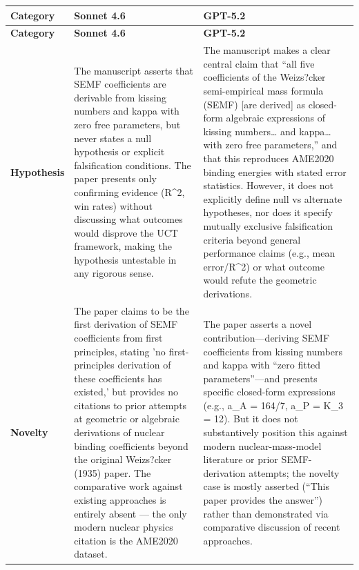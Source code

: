 \documentclass[11pt]{article}
\begin{document}
\begin{longtable}{@{} p{2.2cm} p{6.3cm} p{6.3cm} @{}}
\toprule
\textbf{Category} & \textbf{Sonnet 4.6} & \textbf{GPT-5.2} \\
\midrule
\endfirsthead
\toprule
\textbf{Category} & \textbf{Sonnet 4.6} & \textbf{GPT-5.2} \\
\midrule
\endhead
\bottomrule
\endlastfoot

\rowcolor{rowgray}
\textbf{Hypothesis} &
The manuscript asserts that SEMF coefficients are derivable from kissing numbers and kappa with zero free parameters, but never states a null hypothesis or explicit falsification conditions. The paper presents only confirming evidence (R\textasciicircum{}2, win rates) without discussing what outcomes would disprove the UCT framework, making the hypothesis untestable in any rigorous sense. &
The manuscript makes a clear central claim that ``all five coefficients of the Weizs?cker semi-empirical mass formula (SEMF) [are derived] as closed-form algebraic expressions of kissing numbers\ldots{} and kappa\ldots{} with zero free parameters,'' and that this reproduces AME2020 binding energies with stated error statistics. However, it does not explicitly define null vs alternate hypotheses, nor does it specify mutually exclusive falsification criteria beyond general performance claims (e.g., mean error/R\textasciicircum{}2) or what outcome would refute the geometric derivations. \\[6pt]

\textbf{Novelty} &
The paper claims to be the first derivation of SEMF coefficients from first principles, stating 'no first-principles derivation of these coefficients has existed,' but provides no citations to prior attempts at geometric or algebraic derivations of nuclear binding coefficients beyond the original Weizs?cker (1935) paper. The comparative work against existing approaches is entirely absent --- the only modern nuclear physics citation is the AME2020 dataset. &
The paper asserts a novel contribution---deriving SEMF coefficients from kissing numbers and kappa with ``zero fitted parameters''---and presents specific closed-form expressions (e.g., a\_A = 164/7, a\_P = K\_3 = 12). But it does not substantively position this against modern nuclear-mass-model literature or prior SEMF-derivation attempts; the novelty case is mostly asserted (``This paper provides the answer'') rather than demonstrated via comparative discussion of recent approaches. \\[6pt]


\end{longtable}
\end{document}
